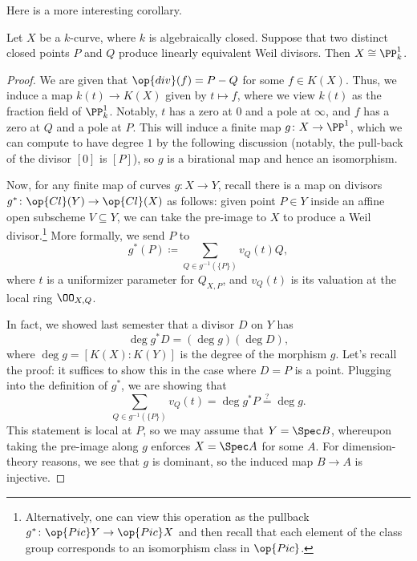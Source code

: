 \documentclass[../notes.tex]{subfiles}
\begin{document}
Here is a more interesting corollary.
\begin{lemma} \label{lem:get-to-p1}
	Let $X$ be a $k$-curve, where $k$ is algebraically closed. Suppose that two distinct closed points $P$ and $Q$ produce linearly equivalent Weil divisors. Then $X\cong\PP^1_k$.
\end{lemma}
\begin{proof}
	We are given that $\op{div}(f)=P-Q$ for some $f\in K(X)$. Thus, we induce a map $k(t)\to K(X)$ given by $t\mapsto f$, where we view $k(t)$ as the fraction field of $\PP^1_k$. Notably, $t$ has a zero at $0$ and a pole at $\infty$, and $f$ has a zero at $Q$ and a pole at $P$. This will induce a finite map $g\colon X\to\PP^1$, which we can compute to have degree $1$ by the following discussion (notably, the pull-back of the divisor $[0]$ is $[P]$), so $g$ is a birational map and hence an isomorphism.

	Now, for any finite map of curves $g\colon X\to Y$, recall there is a map on divisors $g^*\colon\op{Cl}(Y)\to\op{Cl}(X)$ as follows: given point $P\in Y$ inside an affine open subscheme $V\subseteq Y$, we can take the pre-image to $X$ to produce a Weil divisor.\footnote{Alternatively, one can view this operation as the pullback $g^*\colon\op{Pic}Y\to\op{Pic}X$ and then recall that each element of the class group corresponds to an isomorphism class in $\op{Pic}$.} More formally, we send $P$ to
	\[g^*(P)\coloneqq\sum_{Q\in g^{-1}(\{P\})}v_Q(t)Q,\]
	where $t$ is a uniformizer parameter for $Q_{X,P}$, and $v_Q(t)$ is its valuation at the local ring $\OO_{X,Q}$.
	
	In fact, we showed last semester that a divisor $D$ on $Y$ has
	\[\deg g^*D=(\deg g)(\deg D),\]
	where $\deg g=[K(X):K(Y)]$ is the degree of the morphism $g$. Let's recall the proof: it suffices to show this in the case where $D=P$ is a point. Plugging into the definition of $g^*$, we are showing that
	\[\sum_{Q\in g^{-1}(\{P\})}v_Q(t)=\deg g^*P\stackrel?=\deg g.\]
	This statement is local at $P$, so we may assume that $Y=\Spec B$, whereupon taking the pre-image along $g$ enforces $X=\Spec A$ for some $A$. For dimension-theory reasons, we see that $g$ is dominant, so the induced map $B\to A$ is injective.
	

\end{proof}
\end{document}
